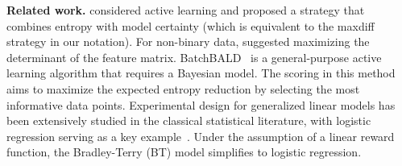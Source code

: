 \textbf{Related work.}
\citet{muldrew2024active} considered active learning and proposed a strategy that combines entropy with model certainty (which is equivalent to the maxdiff strategy in our notation). For non-binary data, \citet{mukherjee2024optimal} suggested maximizing the determinant of the feature matrix. BatchBALD~\citep{kirsch2019batchbald} is a general-purpose active learning algorithm that requires a Bayesian model. The scoring in this method aims to maximize the expected entropy reduction by selecting the most informative data points. Experimental design for generalized linear models has been extensively studied in the classical statistical literature, with logistic regression serving as a key example~\citep[see e.g.,][]{chaloner1995bayesian, sener2017active}. Under the assumption of a linear reward function, the Bradley-Terry (BT) model simplifies to logistic regression. 